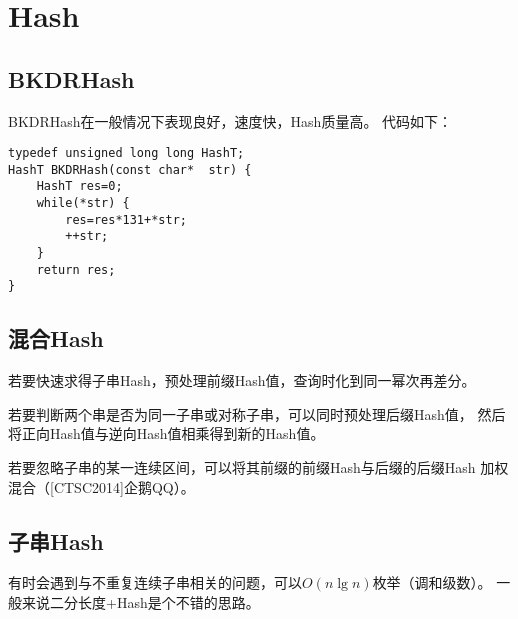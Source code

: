\section{Hash}
\subsection{BKDRHash}
BKDRHash在一般情况下表现良好，速度快，Hash质量高。
代码如下：
\begin{lstlisting}
typedef unsigned long long HashT;
HashT BKDRHash(const char*  str) {
    HashT res=0;
    while(*str) {
        res=res*131+*str;
        ++str;
    }
    return res;
}
\end{lstlisting}
\subsection{混合Hash}
若要快速求得子串Hash，预处理前缀Hash值，查询时化到同一幂次再差分。

若要判断两个串是否为同一子串或对称子串，可以同时预处理后缀Hash值，
然后将正向Hash值与逆向Hash值相乘得到新的Hash值。

若要忽略子串的某一连续区间，可以将其前缀的前缀Hash与后缀的后缀Hash
加权混合（[CTSC2014]企鹅QQ）。
\subsection{子串Hash}
有时会遇到与不重复连续子串相关的问题，可以$O(n\lg n)$枚举（调和级数）。
一般来说二分长度+Hash是个不错的思路。
